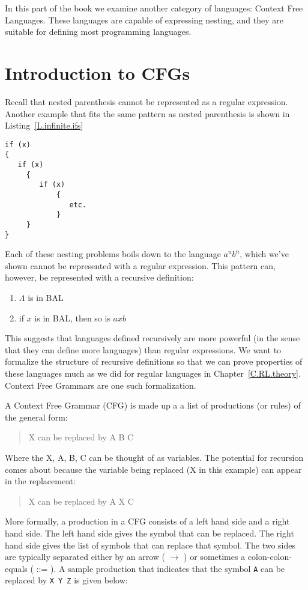 \documentclass[letterpaper,12pt,openany,reqno]{book}%
\newcommand{\code}[1] {\lstinline[breaklines=yes,breakatwhitespace=yes]{#1}}
\begin{document}
In this part of the book we examine another category of languages: Context Free Languages. These languages are capable of expressing nesting, and they are suitable for defining most programming languages.

\section{Introduction to CFGs}
Recall that nested parenthesis cannot be represented as a regular expression. Another example that fits the same pattern as nested parenthesis is shown in Listing~\ref{L.infinite.ifs}
\begin{lstlisting}[caption={Nested if statements},label=L.infinite.ifs]
if (x)
{
   if (x)
	 {
	    if (x)
			{
			   etc.
			}
	 }
}
\end{lstlisting}
Each of these nesting problems boils down to the language $a^nb^n$, which we've shown cannot be represented with a regular expression. This pattern can, however, be represented with a recursive definition:
\begin{enumerate}
\item $\Lambda$ is in BAL
\item if $x$ is in BAL, then so is $axb$
\end{enumerate}

This suggests that languages defined recursively are more powerful (in the sense that they can define more languages) than regular expressions. We want to formalize the structure of recursive definitions so that we can prove properties of these languages much as we did for regular languages in Chapter~\ref{C.RL.theory}. Context Free Grammars are one such formalization.

A Context Free Grammar (CFG) is made up a a list of productions (or rules) of the general form:
\begin{quote}
X can be replaced by A B C
\end{quote}
Where the X, A, B, C can be thought of as variables. The potential for recursion comes about because the variable being replaced (X in this example) can appear in the replacement:
\begin{quote}
X can be replaced by A X C
\end{quote}

More formally, a production in a CFG consists of a left hand side and a right hand side. The left hand side gives the symbol that can be replaced. The right hand side gives the list of symbols that can replace that symbol. The two sides are typically separated 
either by an arrow ( $\rightarrow$ ) 
or sometimes a colon-colon-equals ( ::= ). 
A sample production that indicates that the symbol \code{A} 
can be replaced by \code{X Y Z} is given below:
\end{document}
